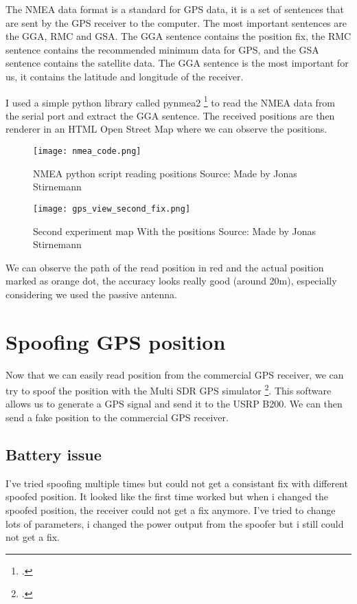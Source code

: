 The NMEA data format is a standard for GPS data, it is a set of sentences that are sent by the GPS receiver to the computer. The most important sentences are the GGA, RMC and GSA. The GGA sentence contains the position fix, the RMC sentence contains the recommended minimum data for GPS, and the GSA sentence contains the satellite data. The GGA sentence is the most important for us, it contains the latitude and longitude of the receiver.

I used a simple python library called pynmea2 \footcite{noauthor_nmea_2024} to read the NMEA data from the serial port and extract the GGA sentence. The received positions are then renderer in an HTML Open Street Map where we can observe the positions.

\begin{figure}[H]
	\centering
	\texttt{[image: nmea\_code.png]}
	\caption[NMEA python script]{NMEA python script reading positions  Source: Made by Jonas Stirnemann}
	\label{fig:nmea_code}
\end{figure}


\begin{figure}[H]
	\centering
	\texttt{[image: gps\_view\_second\_fix.png]}
	\caption[Second experiment map]{Second experiment map With the positions Source: Made by Jonas Stirnemann}
	\label{fig:second_fix}
\end{figure}

We can observe the path of the read position in red and the actual position marked as orange dot, the accuracy looks really good (around 20m), especially considering we used the passive antenna.

\section{Spoofing GPS position}

Now that we can easily read position from the commercial GPS receiver, we can try to spoof the position with the Multi SDR GPS simulator \footcite{mictronics_mictronicsmulti-sdr-gps-sim_2024}. This software allows us to generate a GPS signal and send it to the USRP B200. We can then send a fake position to the commercial GPS receiver.

\subsection{Battery issue}

I've tried spoofing multiple times but could not get a consistant fix with different spoofed position. It looked like the first time worked but when i changed the spoofed position, the receiver could not get a fix anymore. I've tried to change lots of parameters, i changed the power output from the spoofer but i still could not get a fix.

